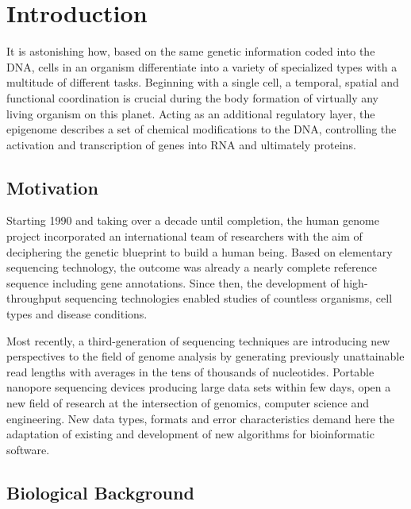 \chapter{Introduction}
\label{cha:intro}

It is astonishing how, based on the same genetic information coded into the DNA, cells in an organism differentiate into a variety of specialized types with a multitude of different tasks. 
Beginning with a single cell, a temporal, spatial and functional coordination is crucial during the body formation of virtually any living organism on this planet. 
Acting as an additional regulatory layer, the epigenome describes a set of chemical modifications to the DNA, controlling the activation and transcription of genes into RNA and ultimately proteins.




\section{Motivation}
\label{sec:intro:motivation}

Starting 1990 and taking over a decade until completion, the human genome project incorporated an international team of researchers with the aim of deciphering the genetic blueprint to build a human being. Based on elementary sequencing technology, the outcome was already a nearly complete reference sequence including gene annotations.
Since then, the development of high-throughput sequencing technologies enabled studies of countless organisms, cell types and disease conditions.

Most recently, a third-generation of sequencing techniques are introducing new perspectives to the field of genome analysis by generating previously unattainable read lengths with averages in the tens of thousands of nucleotides.
Portable nanopore sequencing devices producing large data sets within few days, open a new field of research at the intersection of genomics, computer science and engineering. New data types, formats and error characteristics demand here the adaptation of existing and development of new algorithms for bioinformatic software.




\section{Biological Background}
\label{sec:intro:bio}

